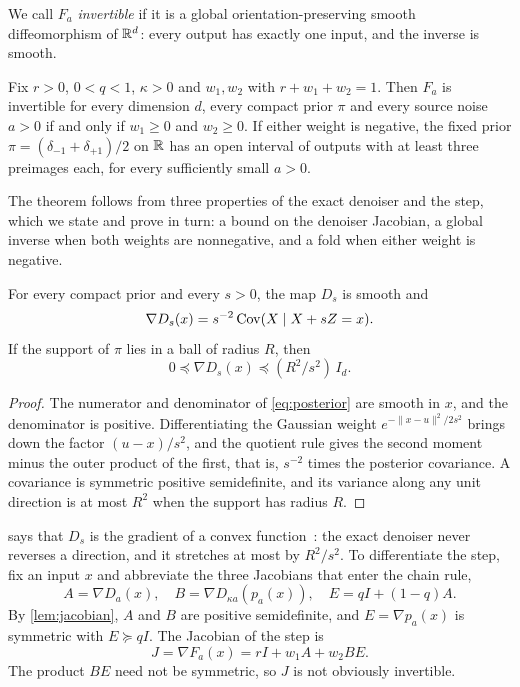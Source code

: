 We call $F_a$ \emph{invertible} if it is a global orientation-preserving smooth diffeomorphism of $\mathbb R^d$: every output has exactly one input, and the inverse is smooth.

\begin{theorem}
\label{thm:sharp}
Fix $r>0$, $0<q<1$, $\kappa>0$ and $w_1,w_2$ with $r+w_1+w_2=1$. Then $F_a$ is invertible for every dimension $d$, every compact prior $\pi$ and every source noise $a>0$ if and only if $w_1\ge0$ and $w_2\ge0$. If either weight is negative, the fixed prior $\pi=(\delta_{-1}+\delta_{+1})/2$ on $\mathbb R$ has an open interval of outputs with at least three preimages each, for every sufficiently small $a>0$.
\end{theorem}

The theorem follows from three properties of the exact denoiser and the step, which we state and prove in turn: a bound on the denoiser Jacobian, a global inverse when both weights are nonnegative, and a fold when either weight is negative.

\begin{lemma}
\label{lem:jacobian}
For every compact prior and every $s>0$, the map $D_s$ is smooth and
\begin{equation}
 \nabla D_s(x)=s^{-2}\operatorname{Cov}(X\mid X+sZ=x).
 \label{eq:covariance}
\end{equation}
If the support of $\pi$ lies in a ball of radius $R$, then
\begin{equation}
 0\preceq\nabla D_s(x)\preceq (R^2/s^2)\,I_d .
 \label{eq:jacbound}
\end{equation}
\end{lemma}
\begin{proof}
The numerator and denominator of \cref{eq:posterior} are smooth in $x$, and the denominator is positive. Differentiating the Gaussian weight $e^{-\|x-u\|^2/2s^2}$ brings down the factor $(u-x)/s^2$, and the quotient rule gives the second moment minus the outer product of the first, that is, $s^{-2}$ times the posterior covariance. A covariance is symmetric positive semidefinite, and its variance along any unit direction is at most $R^2$ when the support has radius $R$.
\end{proof}

 says that $D_s$ is the gradient of a convex function~\cite{gribonval2021}: the exact denoiser never reverses a direction, and it stretches at most by $R^2/s^2$. To differentiate the step, fix an input $x$ and abbreviate the three Jacobians that enter the chain rule,
\[
 A=\nabla D_a(x),\quad B=\nabla D_{\kappa a}(p_a(x)),\quad E=qI+(1-q)A .
\]
By \cref{lem:jacobian}, $A$ and $B$ are positive semidefinite, and $E=\nabla p_a(x)$ is symmetric with $E\succeq qI$. The Jacobian of the step is
\begin{equation}
 J=\nabla F_a(x)=rI+w_1A+w_2BE .
 \label{eq:jacobian}
\end{equation}
The product $BE$ need not be symmetric, so $J$ is not obviously invertible.

